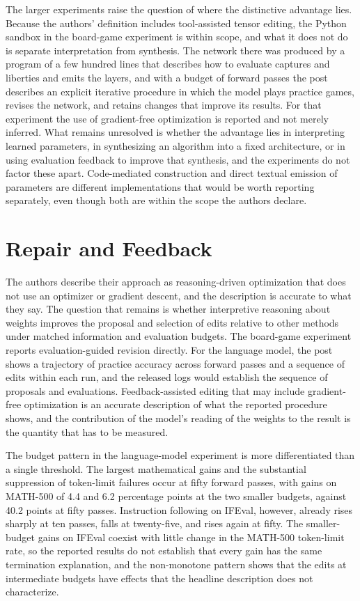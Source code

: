 \documentclass[11pt]{article}
\begin{document}
The larger experiments raise the question of where the distinctive advantage lies. Because the authors' definition includes tool-assisted tensor editing, the Python sandbox in the board-game experiment is within scope, and what it does not do is separate interpretation from synthesis. The network there was produced by a program of a few hundred lines that describes how to evaluate captures and liberties and emits the layers, and with a budget of forward passes the post describes an explicit iterative procedure in which the model plays practice games, revises the network, and retains changes that improve its results. For that experiment the use of gradient-free optimization is reported and not merely inferred. What remains unresolved is whether the advantage lies in interpreting learned parameters, in synthesizing an algorithm into a fixed architecture, or in using evaluation feedback to improve that synthesis, and the experiments do not factor these apart. Code-mediated construction and direct textual emission of parameters are different implementations that would be worth reporting separately, even though both are within the scope the authors declare.

\section{Repair and Feedback}

The authors describe their approach as reasoning-driven optimization that does not use an optimizer or gradient descent, and the description is accurate to what they say. The question that remains is whether interpretive reasoning about weights improves the proposal and selection of edits relative to other methods under matched information and evaluation budgets. The board-game experiment reports evaluation-guided revision directly. For the language model, the post shows a trajectory of practice accuracy across forward passes and a sequence of edits within each run, and the released logs would establish the sequence of proposals and evaluations. Feedback-assisted editing that may include gradient-free optimization is an accurate description of what the reported procedure shows, and the contribution of the model's reading of the weights to the result is the quantity that has to be measured.

The budget pattern in the language-model experiment is more differentiated than a single threshold. The largest mathematical gains and the substantial suppression of token-limit failures occur at fifty forward passes, with gains on MATH-500 of 4.4 and 6.2 percentage points at the two smaller budgets, against 40.2 points at fifty passes. Instruction following on IFEval, however, already rises sharply at ten passes, falls at twenty-five, and rises again at fifty. The smaller-budget gains on IFEval coexist with little change in the MATH-500 token-limit rate, so the reported results do not establish that every gain has the same termination explanation, and the non-monotone pattern shows that the edits at intermediate budgets have effects that the headline description does not characterize.
\end{document}
